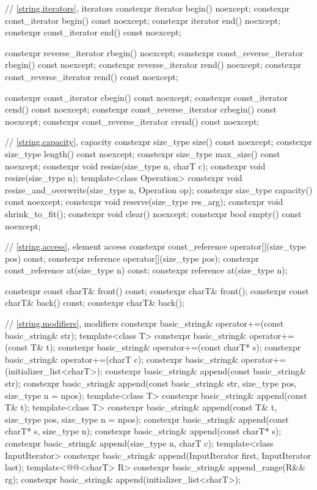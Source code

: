 \begin{codeblock}
{{    // \ref{string.iterators}, iterators
    constexpr iterator       begin() noexcept;
    constexpr const_iterator begin() const noexcept;
    constexpr iterator       end() noexcept;
    constexpr const_iterator end() const noexcept;

    constexpr reverse_iterator       rbegin() noexcept;
    constexpr const_reverse_iterator rbegin() const noexcept;
    constexpr reverse_iterator       rend() noexcept;
    constexpr const_reverse_iterator rend() const noexcept;

    constexpr const_iterator         cbegin() const noexcept;
    constexpr const_iterator         cend() const noexcept;
    constexpr const_reverse_iterator crbegin() const noexcept;
    constexpr const_reverse_iterator crend() const noexcept;

    // \ref{string.capacity}, capacity
    constexpr size_type size() const noexcept;
    constexpr size_type length() const noexcept;
    constexpr size_type max_size() const noexcept;
    constexpr void resize(size_type n, charT c);
    constexpr void resize(size_type n);
    template<class Operation> constexpr void resize_and_overwrite(size_type n, Operation op);
    constexpr size_type capacity() const noexcept;
    constexpr void reserve(size_type res_arg);
    constexpr void shrink_to_fit();
    constexpr void clear() noexcept;
    constexpr bool empty() const noexcept;

    // \ref{string.access}, element access
    constexpr const_reference operator[](size_type pos) const;
    constexpr reference       operator[](size_type pos);
    constexpr const_reference at(size_type n) const;
    constexpr reference       at(size_type n);

    constexpr const charT& front() const;
    constexpr charT&       front();
    constexpr const charT& back() const;
    constexpr charT&       back();

    // \ref{string.modifiers}, modifiers
    constexpr basic_string& operator+=(const basic_string& str);
    template<class T>
      constexpr basic_string& operator+=(const T& t);
    constexpr basic_string& operator+=(const charT* s);
    constexpr basic_string& operator+=(charT c);
    constexpr basic_string& operator+=(initializer_list<charT>);
    constexpr basic_string& append(const basic_string& str);
    constexpr basic_string& append(const basic_string& str, size_type pos, size_type n = npos);
    template<class T>
      constexpr basic_string& append(const T& t);
    template<class T>
      constexpr basic_string& append(const T& t, size_type pos, size_type n = npos);
    constexpr basic_string& append(const charT* s, size_type n);
    constexpr basic_string& append(const charT* s);
    constexpr basic_string& append(size_type n, charT c);
    template<class InputIterator>
      constexpr basic_string& append(InputIterator first, InputIterator last);
    template<@@<charT> R>
      constexpr basic_string& append_range(R&& rg);
    constexpr basic_string& append(initializer_list<charT>);

}}
\end{codeblock}
